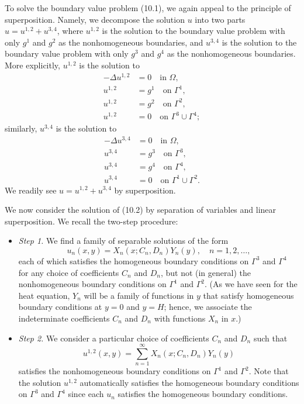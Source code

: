 To solve the boundary value problem (10.1), we again appeal to the principle of superposition. Namely, we decompose the solution $u$ into two parts $u = u^{1,2} + u^{3,4}$, where $u^{1,2}$ is the solution to the boundary value problem with only $g^1$ and $g^2$ as the nonhomogeneous boundaries, and $u^{3,4}$ is the solution to the boundary value problem with only $g^3$ and $g^4$ as the nonhomogeneous boundaries. More explicitly, $u^{1,2}$ is the solution to
\begin{equation*}
    \begin{aligned}
        -\Delta u^{1,2} &= 0 \quad \text{in } \Omega, \\
        u^{1,2} &= g^1 \quad \text{on } \Gamma^1, \\
        u^{1,2} &= g^2 \quad \text{on } \Gamma^2, \\
        u^{1,2} &= 0 \quad \text{on } \Gamma^3 \cup \Gamma^4;
    \end{aligned} \tag{10.2}
\end{equation*}
similarly, $u^{3,4}$ is the solution to
\begin{align*}
    -\Delta u^{3,4} &= 0 \quad \text{in } \Omega, \\
    u^{3,4} &= g^3 \quad \text{on } \Gamma^3, \\
    u^{3,4} &= g^4 \quad \text{on } \Gamma^4, \\
    u^{3,4} &= 0 \quad \text{on } \Gamma^1 \cup \Gamma^2.
\end{align*}
We readily see $u = u^{1,2} + u^{3,4}$ by superposition.

We now consider the solution of (10.2) by separation of variables and linear superposition. We recall the two-step procedure:
\begin{itemize}
    \item \textit{Step 1.} We find a family of separable solutions of the form
    \[u_n(x, y) = X_n(x; C_n, D_n)Y_n(y), \quad n = 1, 2, \dots,\]
    each of which satisfies the homogeneous boundary conditions on $\Gamma^3$ and $\Gamma^4$ for any choice of coefficients $C_n$ and $D_n$, but not (in general) the nonhomogeneous boundary conditions on $\Gamma^1$ and $\Gamma^2$. (As we have seen for the heat equation, $Y_n$ will be a family of functions in $y$ that satisfy homogeneous boundary conditions at $y = 0$ and $y = H$; hence, we associate the indeterminate coefficients $C_n$ and $D_n$ with functions $X_n$ in $x$.)
    \item \textit{Step 2.} We consider a particular choice of coefficients $C_n$ and $D_n$ such that
    \[u^{1,2}(x, y) = \sum_{n=1}^{\infty} X_n(x; C_n, D_n)Y_n(y)\]
    satisfies the nonhomogeneous boundary conditions on $\Gamma^1$ and $\Gamma^2$. Note that the solution $u^{1,2}$ automatically satisfies the homogeneous boundary conditions on $\Gamma^3$ and $\Gamma^4$ since each $u_n$ satisfies the homogeneous boundary conditions.
\end{itemize}

